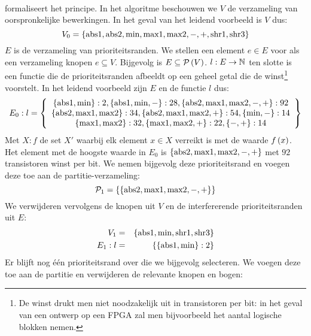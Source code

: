 \paragraph{}
 formaliseert het principe. In het algoritme beschouwen we $V$ de verzameling van oorspronkelijke bewerkingen. In het geval van het leidend voorbeeld is $V$ dus:
\begin{equation}
V_0=\left\{ \mbox{abs1},\mbox{abs2},\mbox{min},\mbox{max1},\mbox{max2},-,+,\mbox{shr1},\mbox{shr3} \right\}
\end{equation}
$E$ is de verzameling van prioriteitsranden. We stellen een element $e\in E$ voor als een verzameling knopen $e\subseteq V$. Bijgevolg is $E\subseteq\mathcal{P}\left( V \right)$. $l:E\rightarrow\mathbb{N}$ ten slotte is een functie die de prioriteitsranden afbeeldt op een geheel getal die de winst\footnote{De winst drukt men niet noodzakelijk uit in transistoren per bit: in het geval van een ontwerp op een FPGA zal men bijvoorbeeld het aantal logische blokken nemen.} voorstelt. In het leidend voorbeeld zijn $E$ en de functie $l$ dus:
\begin{equation}
E_0:l=\left\{ \begin{array}{c} \left\{ \mbox{abs1},\mbox{min} \right\}:2,\left\{ \mbox{abs1},\mbox{min},- \right\}:28,\left\{ \mbox{abs2},\mbox{max1},\mbox{max2},-,+ \right\}:92
\\\left\{ \mbox{abs2},\mbox{max1},\mbox{max2} \right\}:34,\left\{ \mbox{abs2},\mbox{max1},\mbox{max2},+ \right\}:54,\left\{ \mbox{min},- \right\}:14
\\\left\{ \mbox{max1},\mbox{max2} \right\}:32,\left\{ \mbox{max1},\mbox{max2},+ \right\}:22,\left\{ -,+ \right\}:14 \end{array} \right\}
\end{equation}
Met $X:f$ de set $X'$ waarbij elk element $x\in X$ verreikt is met de waarde $f\left( x \right)$. Het element met de hoogste waarde in $E_0$ is $\left\{ \mbox{abs2},\mbox{max1},\mbox{max2},-,+ \right\}$ met $92$ transistoren winst per bit. We nemen bijgevolg deze prioriteitsrand en voegen deze toe aan de partitie-verzameling:
\begin{equation}
\mathcal{P}_1=\left\{ \left\{ \mbox{abs2},\mbox{max1},\mbox{max2},-,+ \right\} \right\}
\end{equation}
We verwijderen vervolgens de knopen uit $V$ en de interfererende prioriteitsranden uit $E$:
\begin{eqnarray}
V_1&=&\left\{ \mbox{abs1},\mbox{min},\mbox{shr1},\mbox{shr3} \right\}\\
E_1:l&=&\left\{ \left\{ \mbox{abs1},\mbox{min} \right\}:2 \right\}
\end{eqnarray}
Er blijft nog \'e\'en prioriteitsrand over die we bijgevolg selecteren. We voegen deze toe aan de partitie en verwijderen de relevante knopen en bogen:

